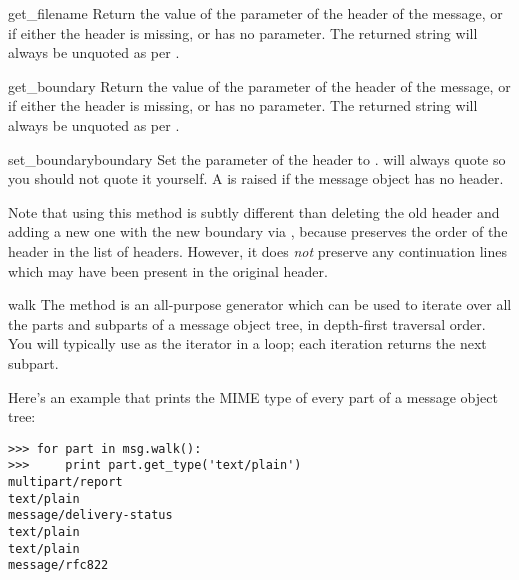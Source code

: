 \begin{methoddesc}[Message]{get_filename}{}
Return the value of the  parameter of the
 header of the message, or  if
either the header is missing, or has no  parameter.
The returned string will always be unquoted as per
.
\end{methoddesc}

\begin{methoddesc}[Message]{get_boundary}{}
Return the value of the  parameter of the
 header of the message, or  if either
the header is missing, or has no  parameter.  The
returned string will always be unquoted as per
.
\end{methoddesc}

\begin{methoddesc}[Message]{set_boundary}{boundary}
Set the  parameter of the  header
to .   will always quote
 so you should not quote it yourself.  A
 is raised if the message object has no
 header.

Note that using this method is subtly different than deleting the old
 header and adding a new one with the new boundary
via , because  preserves the
order of the  header in the list of headers.
However, it does \emph{not} preserve any continuation lines which may
have been present in the original  header.
\end{methoddesc}

\begin{methoddesc}[Message]{walk}{}
The  method is an all-purpose generator which can be
used to iterate over all the parts and subparts of a message object
tree, in depth-first traversal order.  You will typically use
 as the iterator in a  loop; each
iteration returns the next subpart.

Here's an example that prints the MIME type of every part of a message
object tree:

\begin{verbatim}
>>> for part in msg.walk():
>>>     print part.get_type('text/plain')
multipart/report
text/plain
message/delivery-status
text/plain
text/plain
message/rfc822
\end{verbatim}
\end{methoddesc}

